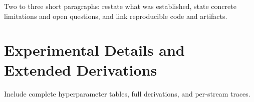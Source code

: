 \documentclass[11pt]{article}
\begin{document}
Two to three short paragraphs: restate what was established, state concrete
limitations and open questions, and link reproducible code and artifacts.




\appendix
\section{Experimental Details and Extended Derivations}
\label{app:details}

Include complete hyperparameter tables, full derivations, and per-stream traces.
\end{document}
